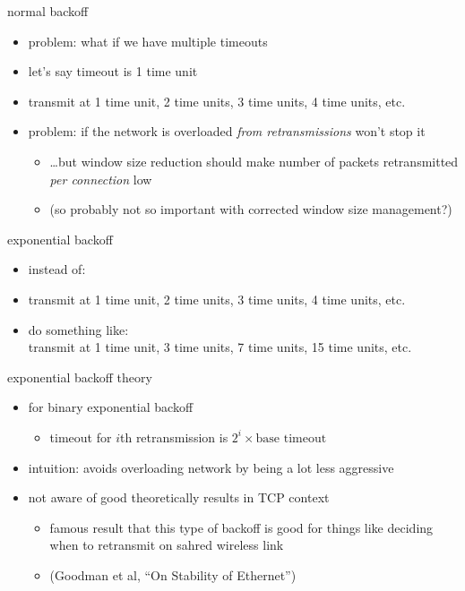\begin{frame}{normal backoff}
    \begin{itemize}
    \item problem: what if we have multiple timeouts
    \vspace{.5cm}
    \item let's say timeout is 1 time unit
    \item transmit at 1 time unit, 2 time units, 3 time units, 4 time units, etc.
    \vspace{.5cm}
    \item problem: if the network is overloaded \textit{from retransmissions} won't stop it
        \begin{itemize}
        \item \ldots but window size reduction should make number of packets retransmitted \textit{per connection} low
        \item (so probably not so important with corrected window size management?)
        \end{itemize}
    \end{itemize}
\end{frame}

\begin{frame}{exponential backoff}
    \begin{itemize}
    \item instead of: \\
    \item transmit at 1 time unit, 2 time units, 3 time units, 4 time units, etc.
    \vspace{.5cm}
    \item do something like: \\
    transmit at 1 time unit, 3 time units, 7 time units, 15 time units, etc.
    \end{itemize}
\end{frame}

\begin{frame}{exponential backoff theory}
    \begin{itemize}
    \item for binary exponential backoff 
        \begin{itemize}
        \item timeout for $i$th retransmission is $2^i \times \text{base timeout}$
        \end{itemize}
    \item intuition: avoids overloading network by being a lot less aggressive
    \item not aware of good theoretically results in TCP context
        \begin{itemize}
        \item famous result that this type of backoff is good for things like deciding when to retransmit on sahred wireless link
        \item (Goodman et al, ``On Stability of Ethernet'')
        \end{itemize}
    \end{itemize}
\end{frame}

